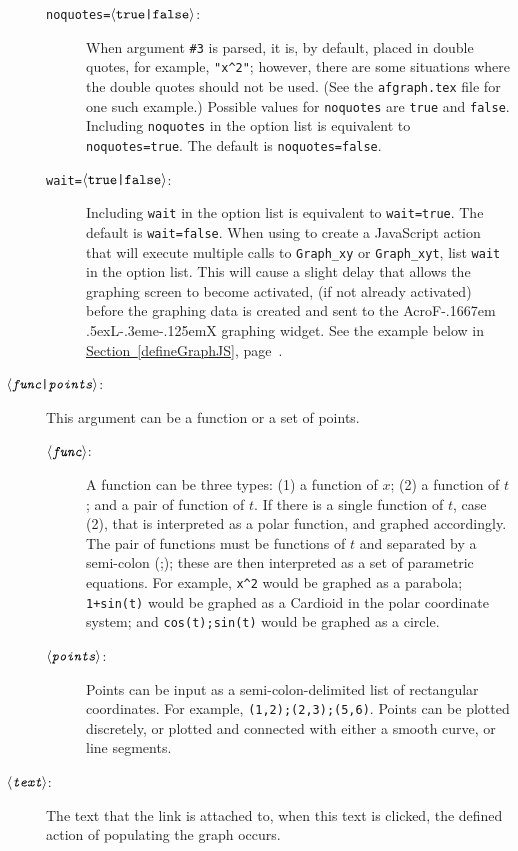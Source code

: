 \documentclass{article}
\makeatletter
\def\anglemeta#1{$\langle\textit{\texttt{#1}}\rangle$}
\let\meta\anglemeta
\def\AcroFLeX{AcroF\kern-.1667em
    \lower.5ex\hbox{L}\kern-.3eme\kern-.125emX\@}
\makeatother
\begin{document}
\begin{description}
\begin{description}
    \item [\texttt{noquotes=\meta{\upshape{true|false}}}:] When argument \texttt{\#3} is parsed, it
        is, by default, placed in double quotes, for example,
        \verb!"x^2"!; however, there are some situations where the
        double quotes should not be used. (See the \texttt{afgraph.tex}
        file for one such example.) Possible values for
        \texttt{noquotes} are \texttt{true} and \texttt{false}.
        Including \texttt{noquotes} in the option list is equivalent to
        \texttt{noquotes=true}. The default is \texttt{noquotes=false}.

    \item [\texttt{wait=\meta{\upshape{true|false}}}:] Including
        \texttt{wait} in the option list is equivalent to
        \texttt{wait=true}. The default is \texttt{wait=false}. When
        using  to create a Java\-Script action that will
        execute multiple calls to \texttt{Graph\_xy} or
        \texttt{Graph\_xyt}, list \texttt{wait} in the option list. This
        will cause a slight delay that allows the graphing screen to
        become activated, (if not already activated) before the graphing
        data is created and sent to the {\AcroFLeX} graphing widget. See
        the example below in
        \hyperref[defineGraphJS]{Section~\ref*{defineGraphJS}},
        page~\pageref*{defineGraphJS}.
    \end{description}
  \item [\meta{func{\upshape|}points}:] This argument can be a function or a set of points.
  \begin{description}
    \item [\meta{func}:] A function can be three types: (1) a function of $x$; (2)
        a function of $t$; and a pair of function of $t$.  If there is a
        single function of $t$, case (2), that is interpreted as a polar
        function, and graphed accordingly. The pair of functions must be
        functions of $t$ and separated by a semi-colon (;); these are
        then interpreted as a set of parametric equations. For example,
        \verb!x^2! would be graphed as a parabola; \verb!1+sin(t)! would
        be graphed as a Cardioid in the polar coordinate system; and
        \verb!cos(t);sin(t)! would be graphed as a circle.

    \item [\meta{points}:] Points can be input as a semi-colon-delimited list of
        rectangular coordinates. For example, \verb!(1,2);(2,3);(5,6)!.
        Points can be plotted discretely, or plotted and connected with
        either a smooth curve, or line segments.
  \end{description}
  \item [\meta{text}:]  The text that the link is attached to, when
      this text is clicked, the defined action of populating the graph
      occurs.
\end{description}
\end{document}
